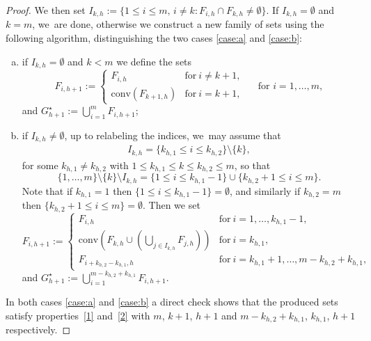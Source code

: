 \begin{proof}
We then set $I_{k,h}:=\{1\le i\le m,\,i\ne k\colon F_{i,h}\cap F_{k,h}\ne\emptyset\}$.
If $I_{k,h}=\emptyset$ and $k=m$, we~are done, otherwise we
construct a new family of sets using the following algorithm, distinguishing the two cases \ref{case:a} and \ref{case:b}:
\begin{enumerate}[(a),wide]
\item\label{case:a} if $I_{k,h}=\emptyset$ and $k<m$
we define the sets
\begin{equation*}
F_{i,h+1}:=\begin{cases}
F_{i,h}& \text{for}\ i\neq{k+1},\\
\mathrm{conv}(F_{k+1,h})&\text{for}\ i=k+1,
\end{cases}\quad \text{ for }i=1,\dots,m,
\end{equation*}
and $
G_{h+1}^\star:=\bigcup_{i=1}^mF_{i,h+1}$;
\item\label{case:b}
if $I_{k,h}\ne\emptyset$,
up to relabeling the indices, we~may assume that
\begin{align*}
I_{k,h}=\{k_{h,1}\le i\le k_{h,2}\}\setminus\{k\},
\end{align*}
for some $k_{h,1}\ne k_{h,2}$ with $1\leq k_{h,1}\le k\le k_{h,2}\leq m$,
so that
\[
\{1,\dots,m\}\setminus\{k\}\setminus I_{k,h}=\{1\le i\le k_{h,1}-1\}\cup\{k_{h,2}+1\le i\le m\}.
\]
Note that if $k_{h,1}=1$ then $\{1\le i\le k_{h,1}-1\}=\emptyset$, and similarly if $k_{h,2}=m$ then $\{k_{h,2}+1\le i\le m\}=\emptyset$.
Then we set
\begin{equation*}
F_{i,h+1}:= \begin{cases}
F_{i,h}& \text{for}\ i=1,\dots,k_{h,1}-1,\\
\mathrm{conv}(F_{k,h}\cup(\bigcup_{j\in I_{k,h}}F_{j,h}))& \text{for}\ i=k_{h,1},\\
F_{i+k_{h,2}-k_{h,1},h}& \text{for}\ i=k_{h,1}+1,\dots, m-k_{h,2}+k_{h,1},
\end{cases}
\end{equation*}
and $G_{h+1}^\star:=\bigcup_{i=1}^{m-k_{h,2}+k_{h,1}}F_{i,h+1}$.
\end{enumerate}
In both cases \ref{case:a} and \ref{case:b} a direct check shows that the produced sets satisfy properties~\ref{1} and~\ref{2} with $m$, $k+1$, $h+1$ and $m-k_{h,2}+k_{h,1}$, $k_{h,1}$, $h+1$ respectively.


\end{proof}

